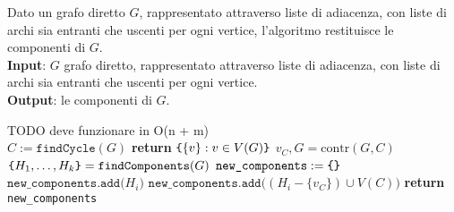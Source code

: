 \documentclass[14pt]{extreport}
\theoremstyle{definition}
\theoremstyle{definition}
\begin{document}
\begin{algorithm}[H]
    \caption{
        Dato un grafo diretto $G$, rappresentato attraverso liste di adiacenza, con liste di archi sia entranti che uscenti per ogni vertice, l'algoritmo restituisce le componenti di $G$.\\
        \textbf{Input}: $G$ grafo diretto, rappresentato attraverso liste di adiacenza, con liste di archi sia entranti che uscenti per ogni vertice.\\
        \textbf{Output}: le componenti di $G$.
    }

    \begin{algorithmic}[1]
            \State TODO deve funzionare in O(n + m)
        \EndFunction
        \\
            \State $C := \texttt{findCycle}(G)$
                \State \textbf{return} $\verb|{|\{v\} : v \in V(G)\verb|}|$ 
            \Else
                \State $v_C, G = \mathrm{contr}(G, C)$ 
                \State $\verb|{|H_1, \ldots, H_k\verb|}| = \texttt{findComponents}(G)$
                \State $\texttt{new\_components} := \verb|{|\verb|}|$ 
                        \State $\texttt{new\_components.add(}H_i\texttt{)}$
                    \Else
                    \State $\texttt{new\_components.add(}(H_i - \{v_C\}) \cup V(C)\texttt{)}$
                    \EndIf
                \EndFor
            \EndIf
            \State \textbf{return} \texttt{new\_components}
        \EndFunction
    \end{algorithmic}
\end{algorithm}
\end{document}
